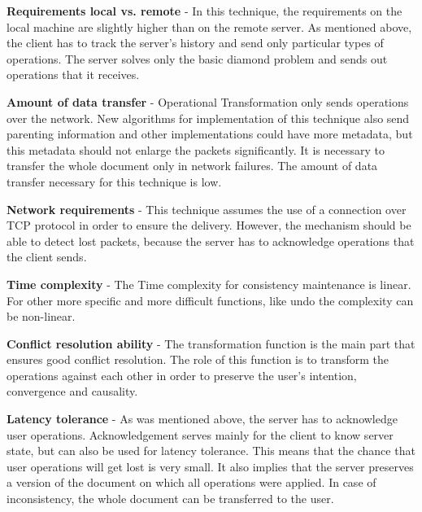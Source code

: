 \documentclass[12pt,oneside]{fithesis2}
\begin{document}
\vspace{3mm}

\textbf{Requirements local vs. remote} - In this technique, the requirements on the local machine are slightly higher than on the remote server. As mentioned above, the client has to track the server's history and send only particular types of operations. The server solves only the basic diamond problem and sends out operations that it receives.

\vspace{3mm}

\textbf{Amount of data transfer} - Operational Transformation only sends operations over the network. New algorithms for implementation of this technique also send parenting information and other implementations could have more metadata, but this metadata should not enlarge the packets significantly. It is necessary to transfer the whole document only in network failures. The amount of data transfer necessary for this technique is low.

\vspace{3mm}

\textbf{Network requirements} - This technique assumes the use of a connection over TCP protocol \cite{Jupiter}\cite{simplified} in order to ensure the delivery. However, the mechanism should be able to detect lost packets, because the server has to acknowledge operations that the client sends. 

\vspace{3mm}

\textbf{Time complexity} - The Time complexity for consistency maintenance is linear.\cite{sequence}\cite{orthogonal} For other more specific and more difficult functions, like undo the complexity can be non-linear.

\vspace{3mm}

\textbf{Conflict resolution ability} - The transformation function is the main part that ensures good conflict resolution. The role of this function is to transform the operations against each other in order to preserve the user's intention, convergence and causality.

\vspace{3mm}

\textbf{Latency tolerance} - As was mentioned above, the server has to acknowledge user operations. Acknowledgement serves mainly for the client to know server state, but can also be used for latency tolerance. This means that the chance that user operations will get lost is very small. It also implies that the server preserves a version of the document on which all operations were applied. In case of inconsistency, the whole document can be transferred to the user.
\end{document}
